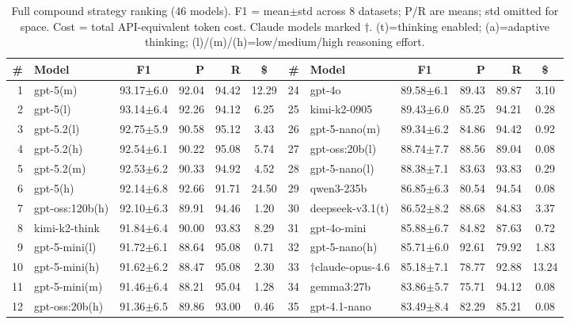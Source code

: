 \documentclass[runningheads]{llncs}
\begin{document}
\begin{table}[htbp]
\centering
\caption{Full compound strategy ranking (46 models). F1 = mean$\pm$std across 8 datasets; P/R are means; std omitted for space. Cost = total API-equivalent token cost. Claude models marked $\dagger$. (t)=thinking enabled; (a)=adaptive thinking; (l)/(m)/(h)=low/medium/high reasoning effort.}
\label{tab:full_ranking}
\setlength{\tabcolsep}{1.5pt}
\tiny
\begin{tabular}{rlcrrc|rlcrrc}
\toprule
\textbf{\#} & \textbf{Model} & \textbf{F1} & \textbf{P} & \textbf{R} & \textbf{\$} & \textbf{\#} & \textbf{Model} & \textbf{F1} & \textbf{P} & \textbf{R} & \textbf{\$} \\
\midrule
1 & gpt-5(m) & 93.17\tiny$\pm$6.0 & 92.04 & 94.42 & 12.29 & 24 & gpt-4o & 89.58\tiny$\pm$6.1 & 89.43 & 89.87 & 3.10 \\
2 & gpt-5(l) & 93.14\tiny$\pm$6.4 & 92.26 & 94.12 & 6.25 & 25 & kimi-k2-0905 & 89.43\tiny$\pm$6.0 & 85.25 & 94.21 & 0.28 \\
3 & gpt-5.2(l) & 92.75\tiny$\pm$5.9 & 90.58 & 95.12 & 3.43 & 26 & gpt-5-nano(m) & 89.34\tiny$\pm$6.2 & 84.86 & 94.42 & 0.92 \\
4 & gpt-5.2(h) & 92.54\tiny$\pm$6.1 & 90.22 & 95.08 & 5.74 & 27 & gpt-oss:20b(l) & 88.74\tiny$\pm$7.7 & 88.56 & 89.04 & 0.08 \\
5 & gpt-5.2(m) & 92.53\tiny$\pm$6.2 & 90.33 & 94.92 & 4.52 & 28 & gpt-5-nano(l) & 88.38\tiny$\pm$7.1 & 83.63 & 93.83 & 0.29 \\
6 & gpt-5(h) & 92.14\tiny$\pm$6.8 & 92.66 & 91.71 & 24.50 & 29 & qwen3-235b & 86.85\tiny$\pm$6.3 & 80.54 & 94.54 & 0.08 \\
7 & gpt-oss:120b(h) & 92.10\tiny$\pm$6.3 & 89.91 & 94.46 & 1.20 & 30 & deepseek-v3.1(t) & 86.52\tiny$\pm$8.2 & 88.68 & 84.83 & 3.37 \\
8 & kimi-k2-think & 91.84\tiny$\pm$6.4 & 90.00 & 93.83 & 8.29 & 31 & gpt-4o-mini & 85.88\tiny$\pm$6.7 & 84.82 & 87.63 & 0.72 \\
9 & gpt-5-mini(l) & 91.72\tiny$\pm$6.1 & 88.64 & 95.08 & 0.71 & 32 & gpt-5-nano(h) & 85.71\tiny$\pm$6.0 & 92.61 & 79.92 & 1.83 \\
10 & gpt-5-mini(h) & 91.62\tiny$\pm$6.2 & 88.47 & 95.08 & 2.30 & 33 & $\dagger$claude-opus-4.6 & 85.18\tiny$\pm$7.1 & 78.77 & 92.88 & 13.24 \\
11 & gpt-5-mini(m) & 91.46\tiny$\pm$6.4 & 88.21 & 95.04 & 1.28 & 34 & gemma3:27b & 83.86\tiny$\pm$5.7 & 75.71 & 94.12 & 0.08 \\
12 & gpt-oss:20b(h) & 91.36\tiny$\pm$6.5 & 89.86 & 93.00 & 0.46 & 35 & gpt-4.1-nano & 83.49\tiny$\pm$8.4 & 82.29 & 85.21 & 0.08 \\

\end{tabular}
\end{table}
\end{document}
